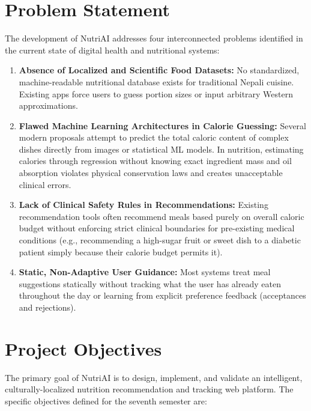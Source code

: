 \documentclass[12pt,a4paper]{report}
\begin{document}
\section{Problem Statement}

The development of NutriAI addresses four interconnected problems identified in the current state of digital health and nutritional systems:

\begin{enumerate}[leftmargin=*]
  \item \textbf{Absence of Localized and Scientific Food Datasets:} No standardized, machine-readable nutritional database exists for traditional Nepali cuisine. Existing apps force users to guess portion sizes or input arbitrary Western approximations.
  \item \textbf{Flawed Machine Learning Architectures in Calorie Guessing:} Several modern proposals attempt to predict the total caloric content of complex dishes directly from images or statistical ML models. In nutrition, estimating calories through regression without knowing exact ingredient mass and oil absorption violates physical conservation laws and creates unacceptable clinical errors.
  \item \textbf{Lack of Clinical Safety Rules in Recommendations:} Existing recommendation tools often recommend meals based purely on overall caloric budget without enforcing strict clinical boundaries for pre-existing medical conditions (e.g., recommending a high-sugar fruit or sweet dish to a diabetic patient simply because their calorie budget permits it).
  \item \textbf{Static, Non-Adaptive User Guidance:} Most systems treat meal suggestions statically without tracking what the user has already eaten throughout the day or learning from explicit preference feedback (acceptances and rejections).
\end{enumerate}

\section{Project Objectives}

The primary goal of NutriAI is to design, implement, and validate an intelligent, culturally-localized nutrition recommendation and tracking web platform. The specific objectives defined for the seventh semester are:
\end{document}
